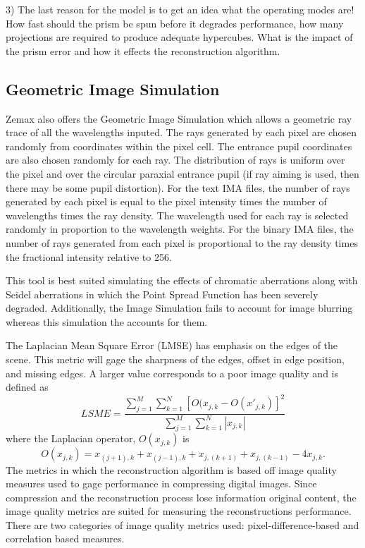 3) The last reason for the model is to get an idea what the operating modes are! How fast should the prism be spun before it degrades performance, how many projections are required to produce adequate hypercubes. What is the impact of the prism error and how it effects the reconstruction algorithm.

\subsection{Geometric Image Simulation}
Zemax also offers the Geometric Image Simulation which allows a geometric ray trace of all the wavelengths inputed. The rays generated by each pixel are chosen randomly from coordinates within the pixel cell. The entrance pupil coordinates are also chosen randomly for each ray. The distribution of rays is uniform over the pixel and over the circular paraxial entrance pupil (if ray aiming is used, then there may be some pupil distortion). For the text IMA files, the number of rays generated by each pixel is equal to the pixel intensity times the number of wavelengths times the ray density. The wavelength used for each ray is selected randomly in proportion to the wavelength weights. For the binary IMA files, the number of rays generated from each pixel is proportional to the ray density times the fractional intensity relative to 256.

This tool is best suited simulating the effects of chromatic aberrations along with Seidel aberrations in which the Point Spread Function has been severely degraded. Additionally, the Image Simulation fails to account for image blurring whereas this simulation the accounts for them.

The Laplacian Mean Square Error (LMSE) has emphasis on the edges of the scene. This metric will gage the sharpness of the edges, offset in edge position, and missing edges. A larger value corresponds to a poor image quality and is defined as
\begin{equation}
\label{eq:LMSE}
LSME = \frac{\sum_{j=1}^{M} \sum_{k=1}^{N} \left[O(x_{j,k} - O(x'_{j,k})\right]^2}{\sum_{j=1}^{M} \sum_{k=1}^{N} \left|x_{j,k}\right|}
\end{equation}
where the Laplacian operator, $O(x_{j,k})$ is
\begin{equation}
\label{eq:LMSEoperator}
O(x_{j,k}) = x_{(j+1),k}+x_{(j-1),k}+x_{j,(k+1)}+x_{j,(k-1)}-4x_{j,k}.
\end{equation}
The metrics in which the reconstruction algorithm is based off image quality measures used to gage performance in compressing digital images. Since compression and the reconstruction process lose information original content, the image quality metrics are suited for measuring the reconstructions performance. There are two categories of image quality metrics used: pixel-difference-based and correlation based measures\cite{Bayram,Damera-Venkata}. 

